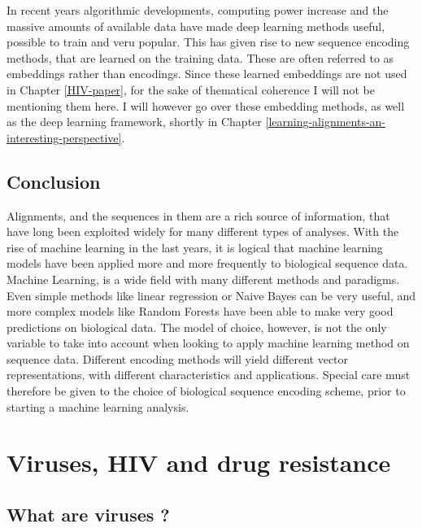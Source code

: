 \documentclass[
  11pt,
  twoside,
  BCOR=10mm,
  listof=totoc]{scrbook}
\begin{document}
In recent years algorithmic developments, computing power increase and the massive amounts of available data have made deep learning methods useful, possible to train and veru popular. This has given rise to new sequence encoding methods, that are learned on the training data. These are often referred to as embeddings rather than encodings. Since these learned embeddings are not used in Chapter \ref{HIV-paper}, for the sake of thematical coherence I will not be mentioning them here. I will however go over these embedding methods, as well as the deep learning framework, shortly in Chapter \ref{learning-alignments-an-interesting-perspective}.

\hypertarget{conclusion-2}{%
\section{Conclusion}\label{conclusion-2}}

Alignments, and the sequences in them are a rich source of information, that have long been exploited widely for many different types of analyses. With the rise of machine learning in the last years, it is logical that machine learning models have been applied more and more frequently to biological sequence data. Machine Learning, is a wide field with many different methods and paradigms. Even simple methods like linear regression or Naive Bayes can be very useful, and more complex models like Random Forests have been able to make very good predictions on biological data. The model of choice, however, is not the only variable to take into account when looking to apply machine learning method on sequence data. Different encoding methods will yield different vector representations, with different characteristics and applications. Special care must therefore be given to the choice of biological sequence encoding scheme, prior to starting a machine learning analysis.

\printbibliography[segment=\therefsegment,heading=subbibintoc,title={References for chapter \thechapter}]

\hypertarget{viruses-hiv-and-drug-resistance}{%
\chapter{Viruses, HIV and drug resistance}\label{viruses-hiv-and-drug-resistance}}

\hypertarget{what-are-viruses}{%
\section{What are viruses ?}\label{what-are-viruses}}
\end{document}
